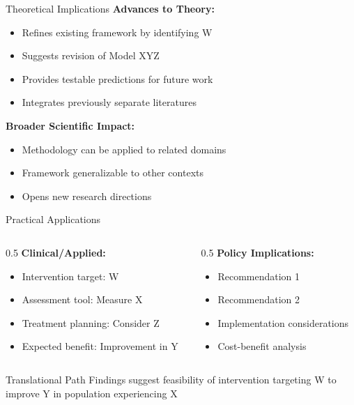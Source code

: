 \documentclass[aspectratio=169,11pt]{beamer}
\begin{document}
\begin{frame}{Theoretical Implications}
  \textbf{Advances to Theory:}
  \begin{itemize}
    \item Refines existing framework by identifying W
    \item Suggests revision of Model XYZ
    \item Provides testable predictions for future work
    \item Integrates previously separate literatures
  \end{itemize}
  
  \vspace{0.5cm}
  
  \textbf{Broader Scientific Impact:}
  \begin{itemize}
    \item Methodology can be applied to related domains
    \item Framework generalizable to other contexts
    \item Opens new research directions
  \end{itemize}
\end{frame}

\begin{frame}{Practical Applications}
  \begin{columns}[T]
    
    \begin{column}{0.5\textwidth}
      \textbf{Clinical/Applied:}
      \begin{itemize}
        \item Intervention target: W
        \item Assessment tool: Measure X
        \item Treatment planning: Consider Z
        \item Expected benefit: Improvement in Y
      \end{itemize}
    \end{column}
    
    \begin{column}{0.5\textwidth}
      \textbf{Policy Implications:}
      \begin{itemize}
        \item Recommendation 1
        \item Recommendation 2
        \item Implementation considerations
        \item Cost-benefit analysis
      \end{itemize}
    \end{column}
    
  \end{columns}
  
  \vspace{0.5cm}
  
  \begin{exampleblock}{Translational Path}
    Findings suggest feasibility of intervention targeting W to improve Y in population experiencing X
  \end{exampleblock}
\end{frame}
\end{document}
